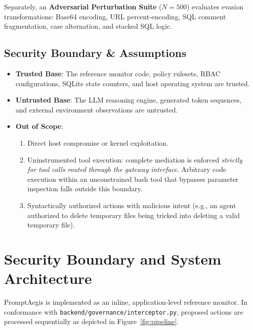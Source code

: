\documentclass[10pt,twocolumn,letterpaper]{article}
\begin{document}
Separately, an \textbf{Adversarial Perturbation Suite} ($N=500$) evaluates evasion transformations: Base64 encoding, URL percent-encoding, SQL comment fragmentation, case alternation, and stacked SQL logic.

\subsection{Security Boundary \& Assumptions}
\begin{itemize}
    \item \textbf{Trusted Base}: The reference monitor code, policy rulesets, RBAC configurations, SQLite state counters, and host operating system are trusted.
    \item \textbf{Untrusted Base}: The LLM reasoning engine, generated token sequences, and external environment observations are untrusted.
    \item \textbf{Out of Scope}: 
    \begin{enumerate}
        \item Direct host compromise or kernel exploitation.
        \item Uninstrumented tool execution: complete mediation is enforced \emph{strictly for tool calls routed through the gateway interface}. Arbitrary code execution within an unconstrained bash tool that bypasses parameter inspection falls outside this boundary.
        \item Syntactically authorized actions with malicious intent (e.g., an agent authorized to delete temporary files being tricked into deleting a valid temporary file).
    \end{enumerate}
\end{itemize}

\section{Security Boundary and System Architecture}

PromptAegis is implemented as an inline, application-level reference monitor. In conformance with \texttt{backend/governance/interceptor.py}, proposed actions are processed sequentially as depicted in Figure~\ref{fig:pipeline}.
\end{document}
